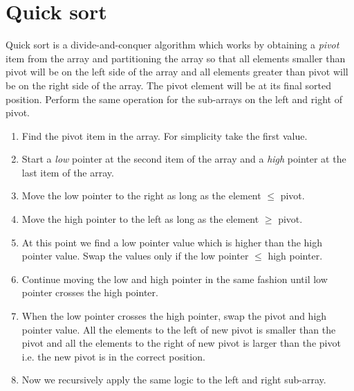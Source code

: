 \documentclass[a4paper,11pt]{book}
\begin{document}
\newpage
\section{Quick sort}

\noindent Quick sort is a divide-and-conquer algorithm which works by obtaining a \textit{pivot} item from the array and partitioning the array so that all elements smaller than pivot will be on the left side of the array and all elements greater than pivot will be on the right side of the array. The pivot element will be at its final sorted position. Perform the same operation for the sub-arrays on the left and right of pivot.
\begin{enumerate}
    \item Find the pivot item in the array. For simplicity take the first value.
    \item Start a \textit{low} pointer at the second item of the array and a \textit{high} pointer at the last item of the array.
    \item Move the low pointer to the right as long as the element $\leq$ pivot.
    \item Move the high pointer to the left as long as the element $\geq$ pivot.
    \item At this point we find a low pointer value which is higher than the high pointer value. Swap the values only if the low pointer $\leq$ high pointer.
    \item Continue moving the low and high pointer in the same fashion until low pointer crosses the high pointer.
    \item When the low pointer crosses the high pointer, swap the pivot and high pointer value. All the elements to the left of new pivot is smaller than the pivot and all the elements to the right of new pivot is larger than the pivot i.e. the new pivot is in the correct position.
    \item Now we recursively apply the same logic to the left and right sub-array.
\end{enumerate}
\end{document}
